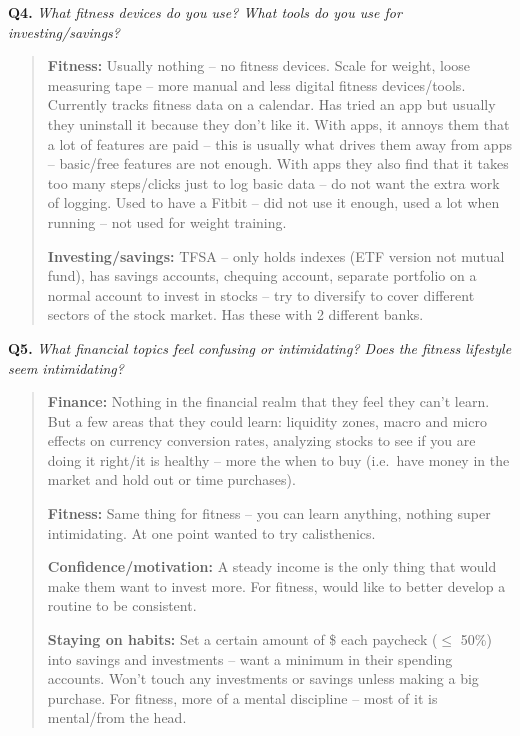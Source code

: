 \documentclass[12pt]{article}
\begin{document}
\medskip
\noindent\textbf{Q4.} \textit{What fitness devices do you use? What tools do you use for investing/savings?}

\begin{quote}
\textbf{Fitness:} Usually nothing -- no fitness devices. Scale for weight, loose measuring tape -- more manual and less digital fitness devices/tools. Currently tracks fitness data on a calendar. Has tried an app but usually they uninstall it because they don't like it. With apps, it annoys them that a lot of features are paid -- this is usually what drives them away from apps -- basic/free features are not enough. With apps they also find that it takes too many steps/clicks just to log basic data -- do not want the extra work of logging. Used to have a Fitbit -- did not use it enough, used a lot when running -- not used for weight training.\par
\textbf{Investing/savings:} TFSA -- only holds indexes (ETF version not mutual fund), has savings accounts, chequing account, separate portfolio on a normal account to invest in stocks -- try to diversify to cover different sectors of the stock market. Has these with 2 different banks.\par
\end{quote}

\medskip
\noindent\textbf{Q5.} \textit{What financial topics feel confusing or intimidating? Does the fitness lifestyle seem intimidating?}

\begin{quote}
\textbf{Finance:} Nothing in the financial realm that they feel they can't learn. But a few areas that they could learn: liquidity zones, macro and micro effects on currency conversion rates, analyzing stocks to see if you are doing it right/it is healthy -- more the when to buy (i.e.\ have money in the market and hold out or time purchases).\par
\textbf{Fitness:} Same thing for fitness -- you can learn anything, nothing super intimidating. At one point wanted to try calisthenics.\par
\textbf{Confidence/motivation:} A steady income is the only thing that would make them want to invest more. For fitness, would like to better develop a routine to be consistent.\par
\textbf{Staying on habits:} Set a certain amount of \$ each paycheck ($\leq$ 50\%) into savings and investments -- want a minimum in their spending accounts. Won't touch any investments or savings unless making a big purchase. For fitness, more of a mental discipline -- most of it is mental/from the head.\par
\end{quote}
\end{document}
